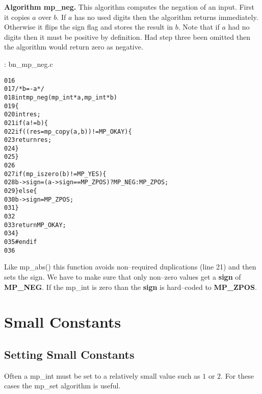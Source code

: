 \documentclass[b5paper]{book}
\begin{document}
\textbf{Algorithm mp\_neg.}
This algorithm computes the negation of an input.  First it copies $a$ over $b$.  If $a$ has no used digits then
the algorithm returns immediately.  Otherwise it flips the sign flag and stores the result in $b$.  Note that if 
$a$ had no digits then it must be positive by definition.  Had step three been omitted then the algorithm would return
zero as negative.

\vspace{+3mm}\begin{small}
\hspace{-5.1mm}{\bf File}: bn\_mp\_neg.c
\vspace{-3mm}
\begin{alltt}
016   
017   /* b = -a */
018   int mp_neg (mp_int * a, mp_int * b)
019   \{
020     int     res;
021     if (a != b) \{
022        if ((res = mp_copy (a, b)) != MP_OKAY) \{
023           return res;
024        \}
025     \}
026   
027     if (mp_iszero(b) != MP_YES) \{
028        b->sign = (a->sign == MP_ZPOS) ? MP_NEG : MP_ZPOS;
029     \} else \{
030        b->sign = MP_ZPOS;
031     \}
032   
033     return MP_OKAY;
034   \}
035   #endif
036   
\end{alltt}
\end{small}

Like mp\_abs() this function avoids non--required duplications (line 21) and then sets the sign.  We
have to make sure that only non--zero values get a \textbf{sign} of \textbf{MP\_NEG}.  If the mp\_int is zero
than the \textbf{sign} is hard--coded to \textbf{MP\_ZPOS}.

\section{Small Constants}
\subsection{Setting Small Constants}
Often a mp\_int must be set to a relatively small value such as $1$ or $2$.  For these cases the mp\_set algorithm is useful.
\end{document}
